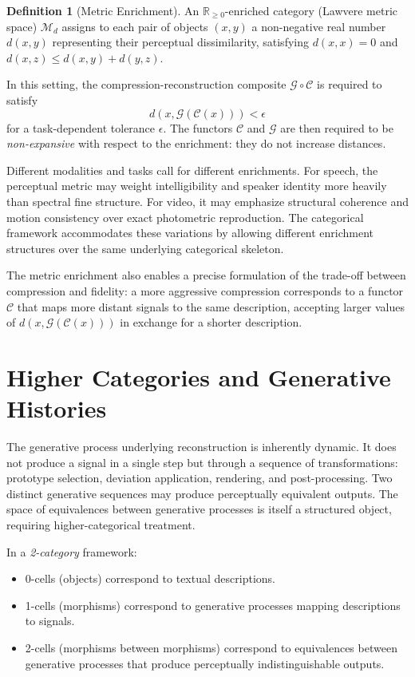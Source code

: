 \documentclass[12pt,a4paper]{article}
\theoremstyle{definition}
\newtheorem{definition}[theorem]{Definition}
\theoremstyle{remark}
\begin{document}
\begin{definition}[Metric Enrichment]
An $\mathbb{R}_{\ge 0}$-enriched category (Lawvere metric space) $\mathcal{M}_d$ assigns to each pair of objects $(x,y)$ a non-negative real number $d(x,y)$ representing their perceptual dissimilarity, satisfying $d(x,x) = 0$ and $d(x,z) \le d(x,y) + d(y,z)$.
\end{definition}

In this setting, the compression-reconstruction composite $\mathcal{G} \circ \mathcal{C}$ is required to satisfy
\[
d(x, \mathcal{G}(\mathcal{C}(x))) < \epsilon
\]
for a task-dependent tolerance $\epsilon$. The functors $\mathcal{C}$ and $\mathcal{G}$ are then required to be \emph{non-expansive} with respect to the enrichment: they do not increase distances.

Different modalities and tasks call for different enrichments. For speech, the perceptual metric may weight intelligibility and speaker identity more heavily than spectral fine structure. For video, it may emphasize structural coherence and motion consistency over exact photometric reproduction. The categorical framework accommodates these variations by allowing different enrichment structures over the same underlying categorical skeleton.

The metric enrichment also enables a precise formulation of the trade-off between compression and fidelity: a more aggressive compression corresponds to a functor $\mathcal{C}$ that maps more distant signals to the same description, accepting larger values of $d(x, \mathcal{G}(\mathcal{C}(x)))$ in exchange for a shorter description.

\section{Higher Categories and Generative Histories}
\label{sec:higher}

The generative process underlying reconstruction is inherently dynamic. It does not produce a signal in a single step but through a sequence of transformations: prototype selection, deviation application, rendering, and post-processing. Two distinct generative sequences may produce perceptually equivalent outputs. The space of equivalences between generative processes is itself a structured object, requiring higher-categorical treatment.

In a \emph{2-category} framework:
\begin{itemize}[noitemsep]
\item 0-cells (objects) correspond to textual descriptions.
\item 1-cells (morphisms) correspond to generative processes mapping descriptions to signals.
\item 2-cells (morphisms between morphisms) correspond to equivalences between generative processes that produce perceptually indistinguishable outputs.
\end{itemize}
\end{document}
